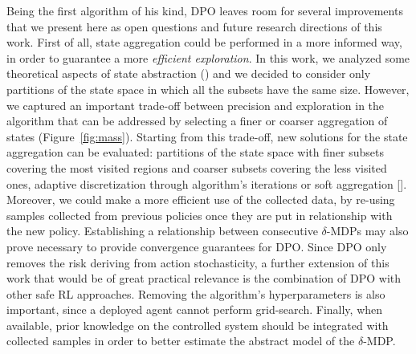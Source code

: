 \newline
Being the first algorithm of his kind, \ac{DPO} leaves room for several improvements that we present here as open questions and future research directions of this work.
First of all, state aggregation could be performed in a more informed way, in order to guarantee a more \textit{efficient exploration}. In this work, we analyzed some theoretical aspects of state abstraction () and we decided to consider only partitions of the state space in which all the subsets have the same size. However, we captured an important trade-off between precision and exploration in the algorithm that can be addressed by selecting a finer or coarser aggregation of states (Figure~\ref{fig:mass}). Starting from this trade-off, new solutions for the state aggregation can be evaluated: partitions of the state space with finer subsets covering the most visited regions and coarser subsets covering the less visited ones, adaptive discretization through algorithm's iterations or soft aggregation [\cite{NIPS1994_981}]. Moreover, we could make a more efficient use of the collected data, by re-using samples collected from previous policies once they are put in relationship with the new policy. Establishing a relationship between consecutive $\delta$-\ac{MDPs} may also prove necessary to provide convergence guarantees for \ac{DPO}. Since \ac{DPO} only removes the risk deriving from action stochasticity, a further extension of this work that would be of great practical relevance is the combination of \ac{DPO} with other safe \ac{RL} approaches. Removing the algorithm's hyperparameters is also important, since a deployed agent cannot perform grid-search. Finally, when available, prior knowledge on the controlled system should be integrated with collected samples in order to better estimate the abstract model of the $\delta$-\ac{MDP}.